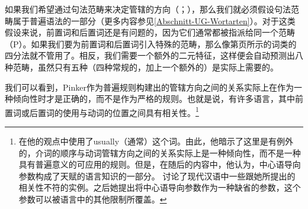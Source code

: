 如果我们希望通过句法范畴来决定管辖的方向（\citealp[]{GW94a}；\citealp[]{Chomsky2005a}），那么我们就必须假设句法范畴属于普遍语法的一部分（更多内容参见\ref{Abschnitt-UG-Wortarten}）。对于这类假设来说，前置词和后置词还是有问题的，因为它们通常都被指派给同一个范畴（P）。如果我们要为前置词和后置词引入特殊的范畴，那么像第\pageref{Tabelle-Merkmalszerlegung-Wortarten}页所示的词类的四分法就不管用了。相反，我们需要一个额外的二元特征，这样便会自动预测出八种范畴，虽然只有五种（四种常规的，加上一个额外的）是实际上需要的。

我们可以看到，Pinker作为普遍规则构建出的管辖方向之间的关系实际上在作为一种倾向性时才是正确的，而不是作为严格的规则。也就是说，有许多语言，其中前置词或后置词的使用与动词的位置之间具有相关性\citep[]{Dryer92a}。\footnote{%
 \citet[]{Pinker94a}在他的观点中使用了usually（通常）这个词。由此，他暗示了这里是有例外的，介词的顺序与动词管辖方向之间的关系实际上是一种倾向性，而不是一种具有普遍意义的可应用的规则。但是，在随后的内容中，他认为，中心语导向参数构成了天赋的语言知识的一部分。 \citet[]{Travis84a-u}讨论了现代汉语中一些跟她所提出的相关性不符的实例。之后她提出将中心语导向参数作为一种缺省的参数，这个参数可以被语言中的其他限制所覆盖。
} 

